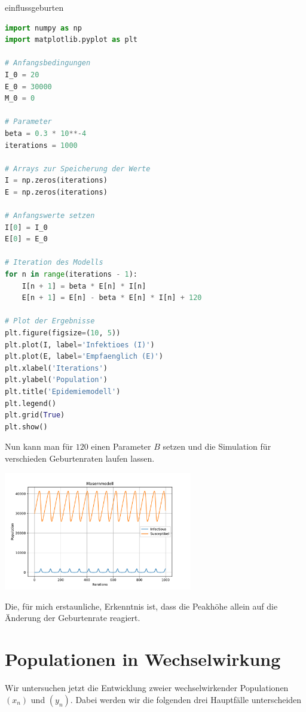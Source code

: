 \documentclass[%
<<<<<<< Updated upstream
11pt,%
twoside,%
titlepage,%
german,%
headsepline%
]{scrartcl}
\begin{document}
\begin{lsg}{einflussgeburten}
    \begin{lstlisting}[language=python]
import numpy as np
import matplotlib.pyplot as plt

# Anfangsbedingungen
I_0 = 20
E_0 = 30000
M_0 = 0

# Parameter
beta = 0.3 * 10**-4
iterations = 1000

# Arrays zur Speicherung der Werte
I = np.zeros(iterations)
E = np.zeros(iterations)

# Anfangswerte setzen
I[0] = I_0
E[0] = E_0

# Iteration des Modells
for n in range(iterations - 1):
    I[n + 1] = beta * E[n] * I[n]
    E[n + 1] = E[n] - beta * E[n] * I[n] + 120

# Plot der Ergebnisse
plt.figure(figsize=(10, 5))
plt.plot(I, label='Infektioes (I)')
plt.plot(E, label='Empfaenglich (E)')
plt.xlabel('Iterations')
plt.ylabel('Population')
plt.title('Epidemiemodell')
plt.legend()
plt.grid(True)
plt.show()
\end{lstlisting}

Nun kann man für $120$ einen Parameter $B$ setzen und die Simulation für verschieden Geburtenraten laufen lassen.
    
\begin{center}	
\includegraphics[width=0.618\textwidth]{pictures/masernmodellpdf}
\end{center}

    Die, für mich erstaunliche, Erkenntnis ist, dass die Peakhöhe allein auf die Änderung der Geburtenrate reagiert.
\end{lsg}

\clearpage

\section{Populationen in Wechselwirkung}
Wir
untersuchen jetzt die Entwicklung zweier wechselwirkender Populationen $(x_n)$ und $(y_n)$. Dabei werden wir die folgenden drei Hauptfälle unterscheiden
\end{document}
